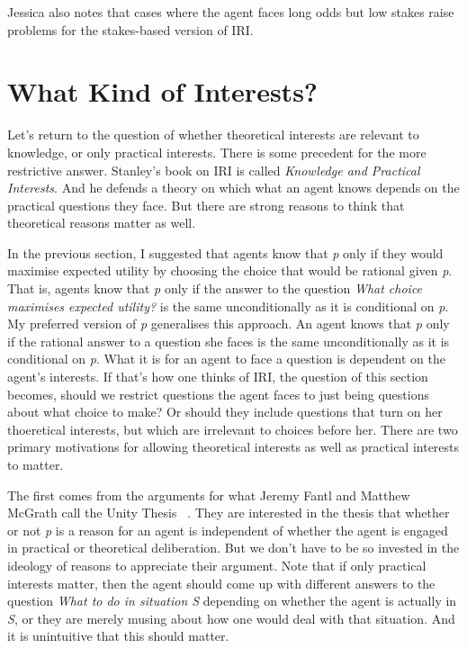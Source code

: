 Jessica  \citet[176]{Brown2008} also notes that cases where the agent faces long odds but low stakes raise problems for the stakes-based version of IRI.

\section{What Kind of Interests?}
\label{whatkindofinterests}

Let's return to the question of whether theoretical interests are relevant to knowledge, or only practical interests. There is some precedent for the more restrictive answer. Stanley's book on IRI is called \emph{Knowledge and Practical Interests}. And he defends a theory on which what an agent knows depends on the practical questions they face. But there are strong reasons to think that theoretical reasons matter as well.

In the previous section, I suggested that agents know that \emph{p} only if they would maximise expected utility by choosing the choice that would be rational given \emph{p}. That is, agents know that \emph{p} only if the answer to the question \emph{What choice maximises expected utility?} is the same unconditionally as it is conditional on \emph{p}. My preferred version of \emph{p} generalises this approach. An agent knows that \emph{p} only if the rational answer to a question she faces is the same unconditionally as it is conditional on \emph{p}. What it is for an agent to face a question is dependent on the agent's interests. If that's how one thinks of IRI, the question of this section becomes, should we restrict questions the agent faces to just being questions about what choice to make? Or should they include questions that turn on her thoeretical interests, but which are irrelevant to choices before her. There are two primary motivations for allowing theoretical interests as well as practical interests to matter.

The first comes from the arguments for what Jeremy Fantl and Matthew McGrath call the Unity Thesis ~\citep[73--6]{FantlMcGrath2009}. They are interested in the thesis that whether or not \emph{p} is a reason for an agent is independent of whether the agent is engaged in practical or theoretical deliberation. But we don't have to be so invested in the ideology of reasons to appreciate their argument. Note that if only practical interests matter, then the agent should come up with different answers to the question \emph{What to do in situation S} depending on whether the agent is actually in \emph{S}, or they are merely musing about how one would deal with that situation. And it is unintuitive that this should matter.

